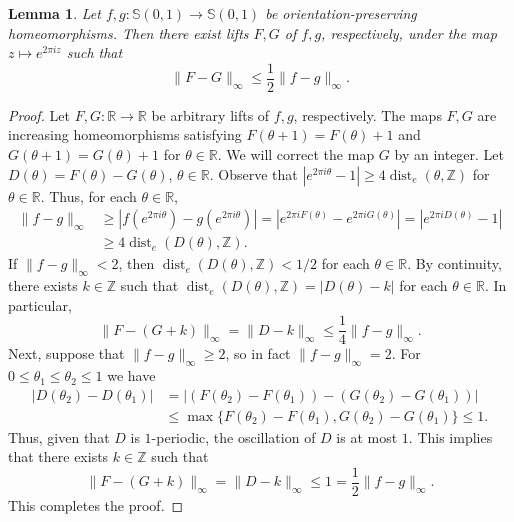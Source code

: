 \documentclass[letterpaper]{amsart}
\theoremstyle{plain}
\newtheorem{lemma}[theorem]{Lemma}
\theoremstyle{definition}
\theoremstyle{remark}
\numberwithin{equation}{section}
\numberwithin{theorem}{section}
\newcommand{\R}{\mathbb R}
\newcommand{\Z}{\mathbb Z}
\DeclareMathOperator{\dist}{dist}
\begin{document}
\begin{lemma}\label{lemma:lift_close}
Let $f,g\colon \mathbb S(0,1)\to \mathbb S(0,1)$ be orientation-preserving homeomorphisms. Then there exist lifts $F,G$ of $f,g$, respectively, under the map $z\mapsto e^{2\pi i z}$ such that 
$$\|F-G\|_\infty\leq \frac{1}{2} \|f-g\|_\infty.$$
\end{lemma}
\begin{proof}
Let $F,G\colon \R\to \R$ be arbitrary lifts of $f,g$, respectively. The maps $F, G$ are increasing homeomorphisms satisfying $F(\theta+1)=F(\theta)+1$ and $G(\theta+1)=G(\theta)+1$ for $\theta\in \R$. We will correct the map $G$ by an integer. Let $D(\theta)=F(\theta)-G(\theta)$, $\theta\in \R$. Observe that $|e^{2\pi i \theta}-1| \geq 4 \dist_e(\theta,\Z)$ for $\theta \in \R$. Thus, for each $\theta\in \R$,
\begin{align*}
\|f-g\|_\infty &\geq |f(e^{2\pi i\theta})-g(e^{2\pi i \theta})|=|e^{2\pi i F(\theta)}-e^{2\pi i G(\theta)}|= |e^{2\pi i D(\theta)}-1| \\
&\geq 4\dist_e(D(\theta),\Z).
\end{align*}
If $\|f-g\|_\infty<2$, then $\dist_e(D(\theta),\Z)<1/2$ for each $\theta\in \R$. By continuity, there exists $k\in \Z$ such that $\dist_e(D(\theta),\Z)= |D(\theta)-k|$ for each $\theta\in \R$. In particular,
$$\|F-(G+k)\|_\infty =\|D-k\|_\infty\leq  \frac{1}{4} \|f-g\|_\infty.$$
Next, suppose that $\|f-g\|_\infty\geq 2$, so in fact $\|f-g\|_\infty=2$. For $0\leq \theta_1\leq \theta_2\leq 1$ we have
\begin{align*}
|D(\theta_2)-D(\theta_1)|&=|(F(\theta_2)-F(\theta_1))- (G(\theta_2)-G(\theta_1 ))| \\
&\leq \max \{ F(\theta_2)-F(\theta_1), G(\theta_2)-G(\theta_1 )\}\leq 1.
\end{align*}
Thus, given that $D$ is $1$-periodic, the oscillation of $D$ is at most $1$. This implies that there exists $k\in \Z$ such that 
$$\|F-(G+k)\|_\infty =\|D-k\|_\infty \leq 1= \frac{1}{2}\|f-g\|_\infty.$$ 
This completes the proof. 
\end{proof}
\end{document}

